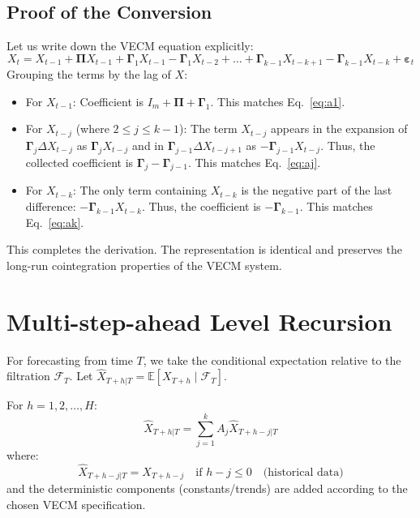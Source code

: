 \documentclass[10pt,a4paper,twocolumn]{article}
\newcommand{\Delt}{\Delta}
\newcommand{\bPi}{\boldsymbol{\Pi}}
\newcommand{\bGamma}{\boldsymbol{\Gamma}}
\newcommand{\beps}{\boldsymbol{\varepsilon}}
\begin{document}
\subsection{Proof of the Conversion}
Let us write down the VECM equation explicitly:
\[
  X_t = X_{t-1} + \bPi X_{t-1} + \bGamma_1 X_{t-1} - \bGamma_1 X_{t-2} + \dots + \bGamma_{k-1} X_{t-k+1} - \bGamma_{k-1} X_{t-k} + \beps_t
\]
Grouping the terms by the lag of $X$:
\begin{itemize}
  \item For $X_{t-1}$: Coefficient is $I_m + \bPi + \bGamma_1$. This matches Eq.~\eqref{eq:a1}.
  \item For $X_{t-j}$ (where $2 \le j \le k-1$): The term $X_{t-j}$ appears in the expansion of $\bGamma_j \Delt X_{t-j}$ as $\bGamma_j X_{t-j}$ and in $\bGamma_{j-1} \Delt X_{t-j+1}$ as $-\bGamma_{j-1} X_{t-j}$. Thus, the collected coefficient is $\bGamma_j - \bGamma_{j-1}$. This matches Eq.~\eqref{eq:aj}.
  \item For $X_{t-k}$: The only term containing $X_{t-k}$ is the negative part of the last difference: $-\bGamma_{k-1} X_{t-k}$. Thus, the coefficient is $-\bGamma_{k-1}$. This matches Eq.~\eqref{eq:ak}.
\end{itemize}
This completes the derivation. The representation is identical and preserves the long-run cointegration properties of the VECM system.

\section{Multi-step-ahead Level Recursion}

For forecasting from time $T$, we take the conditional expectation relative to the filtration $\mathcal{F}_T$. Let $\hat{X}_{T+h|T} = \mathbb{E}[X_{T+h} \mid \mathcal{F}_T]$.

\begin{tcolorbox}[mathbox={VAR levels h-Step Recursion}]
For $h = 1, 2, \dots, H$:
\begin{equation}
  \hat{X}_{T+h|T} = \sum_{j=1}^{k} A_j \hat{X}_{T+h-j|T}
  \label{eq:levels_rec}
\end{equation}
where:
\[
  \hat{X}_{T+h-j|T} = X_{T+h-j} \quad \text{if } h-j \le 0 \quad \text{(historical data)}
\]
and the deterministic components (constants/trends) are added according to the chosen VECM specification.
\end{tcolorbox}
\end{document}
